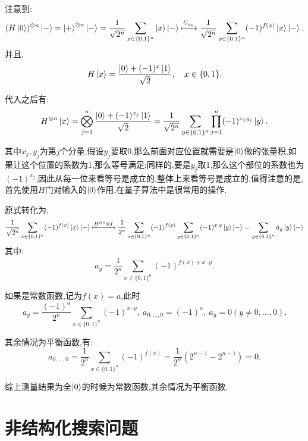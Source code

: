注意到:
\begin{equation*}
	(H\ket{0})^{\otimes n} \ket{-} = \ket{+}^{\otimes n} \ket{-} = \frac{1}{\sqrt{2^n}} \sum_{x \in \{0, 1\}^n} \ket{x} \ket{-} \xmapsto{U_{x_0}} \frac{1}{\sqrt{2^n}} \sum_{x \in \{0, 1\}^n} (-1)^{f(x)} \ket{x} \ket{-} .
\end{equation*}
并且,
\begin{equation}
	H \ket{x} = \frac{\ket{0} + (-1)^x \ket{1}}{\sqrt{2}}, \quad x \in \{0, 1\}.
\end{equation}

代入之后有:
\begin{equation}
	H^{\otimes n} \ket{x} = \bigotimes_{j=1}^n \frac{\ket{0} + (-1)^{x_j} \ket{1}}{\sqrt{2}} 
	= \frac{1}{\sqrt{2^n}} \sum_{y \in \{0, 1\}^n} \prod_{j=1}^n (- 1)^{x_j y_j} \ket{y}.
\end{equation}

其中$x_j,y_j$为第$j$个分量,假设$y_j $要取0,那么前面对应位置就需要是$\ket{0}$做的张量积,如果让这个位置的系数为1,那么等号满足;同样的,要是$y_j$取1,那么这个部位的系数也为$(-1)^{x_j}$,因此从每一位来看等号是成立的,整体上来看等号是成立的.值得注意的是,首先使用$H$门对输入的$\ket{0}$作用,在量子算法中是很常用的操作.

原式转化为,
\begin{equation*}
	\frac{1}{\sqrt{2^n}} \sum_{x \in \{0, 1\}^n} (-1)^{f(x)} \ket{x} \ket{-} \xmapsto{H^{\otimes n}\otimes I} \frac{1}{2^n} \sum_{x \in \{0,1\}^n} (-1)^{f(x)} \sum_{y \in \{0,1\}^n} (-1)^{x \cdot y} \ket{y} \ket{-}
	= \sum_{y \in \{0, 1\}^n} a_y \ket{y} \ket{-}
\end{equation*}
其中:
\begin{equation}
	a_y = \frac{1}{2^n} \sum_{x \in \{0, 1\}^n} (-1)^{f(x) + x \cdot y} .
\end{equation}

如果是常数函数,记为$f(x) = a$,此时
\begin{equation*}
	a_y = \frac{(-1)^a}{2^n} \sum_{x \in \{0, 1\}^n} (-1)^{x \cdot y},~
	a_{0, \ldots, 0} = (-1)^a,~ a_y=0(y \neq 0, \ldots, 0).
\end{equation*}

其余情况为平衡函数,有:
\begin{equation*}	
a_{0, \ldots, 0} = \frac{1}{2^n} \sum_{x \in \{0,1\}^n} (-1)^{f(x)} = \frac{1}{2^n}(2^{n-1}-2^{n-1})=0.
\end{equation*}

综上测量结果为全$\ket{0}$的时候为常数函数,其余情况为平衡函数.

\section{非结构化搜索问题}
